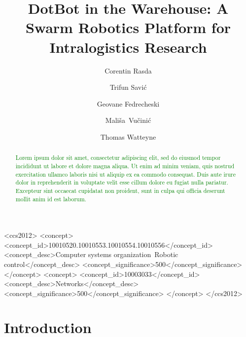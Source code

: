 \documentclass[sigconf, 9pt, nonacm]{acmart}
\newcommand*{\lorem}            {\textcolor{green}{Lorem ipsum dolor sit amet, consectetur adipiscing elit, sed do eiusmod tempor incididunt ut labore et dolore magna aliqua. Ut enim ad minim veniam, quis nostrud exercitation ullamco laboris nisi ut aliquip ex ea commodo consequat. Duis aute irure dolor in reprehenderit in voluptate velit esse cillum dolore eu fugiat nulla pariatur. Excepteur sint occaecat cupidatat non proident, sunt in culpa qui officia deserunt mollit anim id est laborum.}}
\newcommand{\firstauthor}       {Rasda\xspace}
\newcommand{\etal}              {\emph{et~al.}\xspace}
\begin{document}
\title{DotBot in the Warehouse: A Swarm Robotics Platform for Intralogistics Research}

\author{Corentin Rasda}
\author{Trifun Savi\'{c}}
\author{Geovane Fedrecheski}

\author{Mali\v{s}a~Vu\v{c}ini\'{c}}

\author{Thomas Watteyne}

\renewcommand{\shortauthors}{\firstauthor \etal}

\begin{abstract}
\lorem

\end{abstract}

\begin{CCSXML}
<ccs2012>
   <concept>
       <concept_id>10010520.10010553.10010554.10010556</concept_id>
       <concept_desc>Computer systems organization~Robotic control</concept_desc>
       <concept_significance>500</concept_significance>
       </concept>
   <concept>
       <concept_id>10003033</concept_id>
       <concept_desc>Networks</concept_desc>
       <concept_significance>500</concept_significance>
       </concept>
 </ccs2012>
\end{CCSXML}


\maketitle

\section{Introduction}
\label{sec:introduction}
\end{document}
